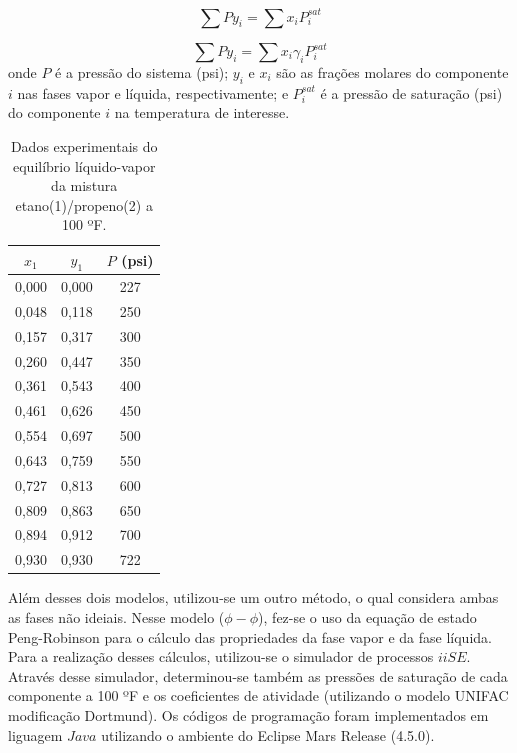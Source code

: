 \begin{equation}\label{eq:raoult}
\sum Py_i = \sum x_iP_i^{sat}
\end{equation}

\begin{equation}\label{eq:raoultmod}
\sum Py_i = \sum x_i\gamma_iP_i^{sat}
\end{equation}
onde $P$ é a pressão do sistema (psi); $y_i$ e $x_i$ são as frações molares do
componente $i$ nas fases vapor e líquida, respectivamente; e $P_i^{sat}$ é a pressão de
saturação (psi) do componente $i$ na temperatura de interesse.

\begin{table}[h]
\renewcommand{\arraystretch}{1.3}
\caption{Dados experimentais do equilíbrio líquido-vapor da mistura
etano(1)/propeno(2) a 100 ºF.}
\footnotesize
\center
\begin{tabular}{SSS[table-format=4.1,round-mode=places,round-precision=0]}
\toprule
   {$x_1$} & {$y_1$}& {$P$ (psi)} \\
,000 & 0,000 & 227 \\
  0,048 & 0,118 & 250 \\
  0,157 & 0,317 & 300 \\
  0,260 & 0,447 & 350 \\
  0,361 & 0,543 & 400 \\
  0,461 & 0,626 & 450 \\
  0,554 & 0,697 & 500 \\
  0,643 & 0,759 & 550 \\
  0,727 & 0,813 & 600 \\
  0,809 & 0,863 & 650 \\
  0,894 & 0,912 & 700 \\
  0,930 & 0,930 & 722 \\
\bottomrule
\end{tabular}
\label{tab:dadosexp}
\end{table}

Além desses dois modelos, utilizou-se um outro método, o qual considera ambas as
fases não ideiais. Nesse modelo ($\phi-\phi$), fez-se o uso da equação de
estado Peng-Robinson para o cálculo das propriedades da fase vapor e da fase
líquida.
Para a realização desses cálculos, utilizou-se o simulador de processos $iiSE$. Através
desse simulador, determinou-se também as pressões de saturação de cada
componente a 100 ºF e os coeficientes de atividade (utilizando o modelo UNIFAC modificação Dortmund). Os códigos de programação foram implementados em
liguagem $Java$ utilizando o ambiente do Eclipse Mars Release (4.5.0).


